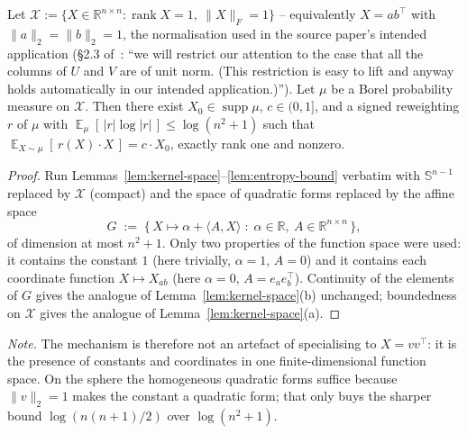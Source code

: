 \documentclass{aicr-solution}
\newcommand{\Expect}{\operatorname*{\mathbb{E}}}
\newcommand{\Sph}{\mathbb{S}^{n-1}}
\newcommand{\Reals}{\mathbb{R}}
\newcommand{\supp}{\operatorname{supp}}
\begin{document}
\begin{corollary}\label{cor:B}
Let $\mathcal{X} := \{X \in \Reals^{n\times n} : \operatorname{rank} X
= 1,\ \|X\|_{F} = 1\}$ -- equivalently $X = ab^{\top}$ with $\|a\|_{2}
= \|b\|_{2} = 1$, the normalisation used in the source paper's
intended application (\S 2.3 of~\cite{BKS16}: ``we will restrict our
attention to the case that all the columns of $U$ and $V$ are of unit
norm. (This restriction is easy to lift and anyway holds automatically
in our intended application.)''). Let $\mu$ be a Borel probability
measure on $\mathcal{X}$. Then there exist $X_{0} \in \supp\mu$, $c
\in (0,1]$, and a signed reweighting $r$ of $\mu$ with
$\Expect_{\mu}[\,|r|\log|r|\,] \le \log(n^{2}+1)$ such that
$\Expect_{X\sim\mu}[\,r(X)\cdot X\,] = c\cdot X_{0}$, exactly rank one
and nonzero.
\end{corollary}

\begin{proof}
Run Lemmas~\ref{lem:kernel-space}--\ref{lem:entropy-bound} verbatim
with $\Sph$ replaced by $\mathcal{X}$ (compact) and the space of
quadratic forms replaced by the affine space
\[
  G \;:=\; \big\{\, X \mapsto \alpha + \langle A,X\rangle \;:\;
    \alpha \in \Reals,\ A \in \Reals^{n\times n} \,\big\},
\]
of dimension at most $n^{2}+1$. Only two properties of the function
space were used: it contains the constant $1$ (here trivially, $\alpha
= 1$, $A = 0$) and it contains each coordinate function $X \mapsto
X_{ab}$ (here $\alpha = 0$, $A = e_{a}e_{b}^{\top}$). Continuity of the
elements of $G$ gives the analogue of Lemma~\ref{lem:kernel-space}(b)
unchanged; boundedness on $\mathcal{X}$ gives the analogue of
Lemma~\ref{lem:kernel-space}(a).
\end{proof}

\smallskip
\noindent\emph{Note.} The mechanism is therefore not an artefact of
specialising to $X = vv^{\top}$: it is the presence of constants and
coordinates in one finite-dimensional function space. On the sphere
the homogeneous quadratic forms suffice because $\|v\|_{2}=1$ makes
the constant a quadratic form; that only buys the sharper bound
$\log(n(n+1)/2)$ over $\log(n^{2}+1)$.
\end{document}

